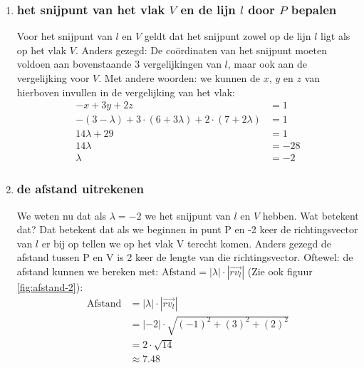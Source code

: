 \begin{enumerate}[label=(\alph*)]
\item \subsubsection{het snijpunt van het vlak $V$ en de lijn $l$ door $P$ bepalen}
Voor het snijpunt van $l$ en $V$ geldt dat het snijpunt zowel op de lijn $l$ ligt als op het vlak $V$. Anders gezegd: De coördinaten  van het snijpunt moeten voldoen aan bovenstaande $3$ vergelijkingen van $l$, maar ook aan de vergelijking voor $V$. Met andere woorden: we kunnen de $x$, $y$ en $z$ van hierboven invullen in de vergelijking van het vlak:
\begin{align*}
  -x + 3y +2z &= 1 \\
  -(3 -\lambda) + 3\cdot(6 + 3\lambda) + 2\cdot(7 + 2\lambda) &= 1 \\
  14\lambda + 29 &= 1 \\
  14\lambda &= -28 \\
  \lambda &= -2
\end{align*}

\item \subsubsection{de afstand uitrekenen}
We weten nu dat als $  \lambda = -2 $ we het snijpunt van $ l  $ en $ V $ hebben. Wat betekent dat? Dat betekent dat als we beginnen in punt P en -2 keer de richtingsvector van $  l $ er bij op tellen we op het vlak V terecht komen.
Anders gezegd de afstand tussen P en V is 2 keer de lengte van die richtingsvector. Oftewel: 
    de afstand kunnen we bereken met: $\text{Afstand} = |\lambda| \cdot |\overrightarrow{rv_{l}}|$ (Zie ook figuur \ref{fig:afstand-2}):
\begin{align*}
  \text{Afstand} &= |\lambda| \cdot |\overrightarrow{rv_{l}}| \\
                 &= |-2| \cdot \sqrt{(-1)^{2} + (3)^{2} + (2)^{2} } \\
                 &= 2 \cdot \sqrt{14} \\
                 &\approx 7.48
\end{align*}

\end{enumerate}	



